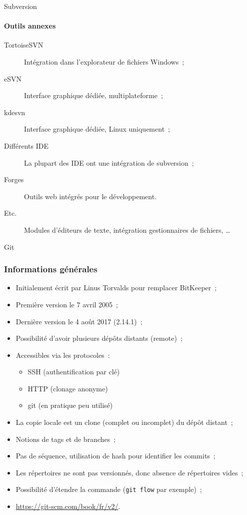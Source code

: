 \begin{frame}{Subversion}
 \framesubtitle{Outils annexes}
 \begin{description}
  \item [TortoiseSVN] Intégration dans l'explorateur de fichiers Windows~;
  \pause
  \item [eSVN] Interface graphique dédiée, multiplateforme~;
  \pause
  \item [kdesvn] Interface graphique dédiée, Linux uniquement~;
  \pause
  \item [Différents IDE] La plupart des IDE ont une intégration de subversion~;
  \pause
  \item [Forges] Outils web intégrés pour le développement.
  \pause
  \item [Etc.] Modules d'éditeurs de texte, intégration gestionnaires de fichiers, \dots
  \pause
 \end{description}
\end{frame}

\begin{frame}[fragile]{Git}
\frametitle{Informations générales}
\begin{itemize}[<+->]
 \item Initialement écrit par Linus Torvalds pour remplacer BitKeeper~;
 \item Première version le 7 avril 2005~;
 \item Dernière version le 4 août 2017 (2.14.1)~;
 \item Possibilité d'avoir plusieurs dépôts distants (remote)~;
 \item Accessibles via les protocoles~:
 \begin{itemize}
  \item SSH (authentification par clé)
  \item HTTP (clonage anonyme)
  \item git (en pratique peu utilisé)
 \end{itemize}
 \item La copie locale est un clone (complet ou incomplet) du dépôt distant~;
 \item Notions de tags et de branches~;
 \item Pas de séquence, utilisation de hash pour identifier les commits~;
 \item Les répertoires ne sont pas versionnés, donc absence de répertoires vides~;
 \item Possibilité d'étendre la commande (\verb/git flow/ par exemple)~;
 \item \url{https://git-scm.com/book/fr/v2/}.
\end{itemize}
\end{frame}

